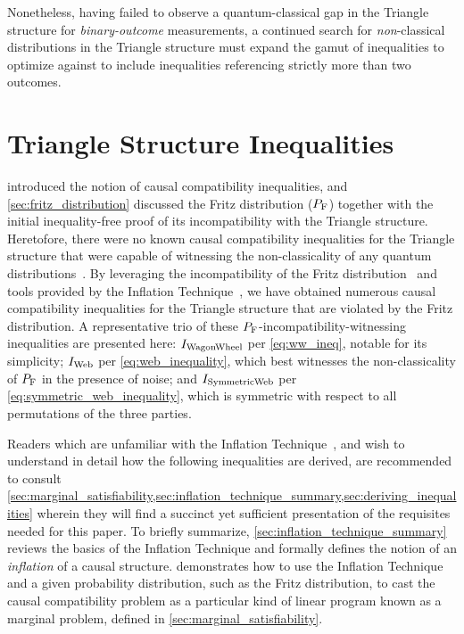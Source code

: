 \documentclass[aps, 10pt, english, twoside, pra, nofootinbib, tightenlines, longbibliography, superscriptaddress]{revtex4-1}
\begin{document}
    Nonetheless, having failed to observe a quantum-classical gap in the Triangle structure for \textit{binary-outcome} measurements, a continued search for \emph{non}-classical distributions in the Triangle structure must expand the gamut of inequalities to optimize against to include inequalities referencing strictly more than two outcomes.

    \section{Triangle Structure Inequalities}
    \label{sec:found_inequalities}

     introduced the notion of causal compatibility inequalities, and \cref{sec:fritz_distribution} discussed the Fritz distribution ($\prob[\fritz]$) together with the initial inequality-free proof of its incompatibility with the Triangle structure. Heretofore, there were no known causal compatibility inequalities for the Triangle structure that were capable of witnessing the non-classicality of any quantum distributions~\cite{Inflation}. By leveraging the incompatibility of the Fritz distribution~\cite{Fritz_2012} and tools provided by the Inflation Technique~\cite{Inflation}, we have obtained numerous causal compatibility inequalities for the Triangle structure that are violated by the Fritz distribution. A representative trio of these $\prob[\fritz]$-incompatibility-witnessing inequalities are presented here: $I_\text{WagonWheel}$ per \cref{eq:ww_ineq}, notable for its simplicity; $I_\text{Web}$ per \cref{eq:web_inequality}, which best witnesses the non-classicality of $\prob[\fritz]$ in the presence of noise; and $I_\text{SymmetricWeb}$ per \cref{eq:symmetric_web_inequality}, which is symmetric with respect to all permutations of the three parties.

    Readers which are unfamiliar with the Inflation Technique~\cite{Inflation}, and wish to understand in detail how the following inequalities are derived, are recommended to consult \cref{sec:marginal_satisfiability,sec:inflation_technique_summary,sec:deriving_inequalities} wherein they will find a succinct yet sufficient presentation of the requisites needed for this paper. To briefly summarize, \cref{sec:inflation_technique_summary} reviews the basics of the Inflation Technique and formally defines the notion of an \textit{inflation} of a causal structure.  demonstrates how to use the Inflation Technique and a given probability distribution, such as the Fritz distribution, to cast the causal compatibility problem as a particular kind of linear program known as a marginal problem, defined in \cref{sec:marginal_satisfiability}.
\end{document}
